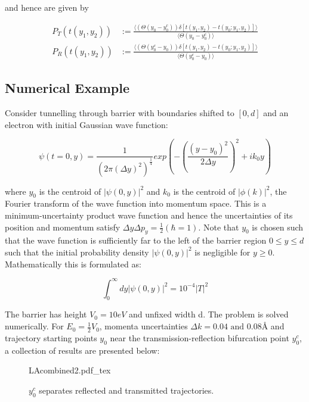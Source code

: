 \documentclass{article}
\newcommand{\incfigsize}[2]{%
    \def\svgwidth{#2cm}
    {#1.pdf_tex}
}
\begin{document}
\noindent and hence are given by

\begin{subequations}
\begin{align}
	P_T(t(y_1,y_2))&:=\frac{\langle(\Theta(y_0-y_0^c))\delta[t(y_1,y_2)-t(y_0;y_1,y_2)]\rangle}{\langle\Theta(y_0-y_0^c)\rangle}\\
	P_R(t(y_1,y_2))&:=\frac{\langle(\Theta(y_0^c-y_0))\delta[t(y_1,y_2)-t(y_0;y_1,y_2)]\rangle}{\langle\Theta(y_0^c-y_0)\rangle}
\end{align}
\end{subequations}

\subsection{Numerical Example}
\label{subsection:dBBexample}
\noindent Consider tunnelling through barrier with boundaries shifted to $[0, d]$ and an electron with initial Gaussian wave function:

\begin{equation}
	\psi(t=0,y) = \frac{1}{(2\pi(\Delta y)^2)^{\frac{1}{4}}}exp\left(-\left(\frac{(y-y_0)^2}{2\Delta y}\right)^2+ik_0y\right)
\end{equation}

\noindent where $y_0$ is the centroid of $|\psi(0,y)|^2$ and $k_0$ is the centroid of $|\phi(k)|^2$, the Fourier transform of the wave function into momentum space. This is a minimum-uncertainty product wave function and hence the uncertainties of its position and momentum satisfy $\Delta y\Delta p_y = \frac{1}{2} (\hbar = 1)$. Note that $y_0$ is chosen such that the wave function is sufficiently far to the left of the barrier region $0\leq y\leq d$ such that the initial probability density $|\psi(0,y)|^2$ is negligible for $y \geq 0$. Mathematically this is formulated as:

\begin{equation}
	\int_0^\infty dy |\psi(0,y)|^2 = 10^{-4}|T|^2
\end{equation}

\noindent The barrier has height $V_0 = 10eV$ and unfixed width d. The problem is solved numerically. For $E_0 = \frac{1}{2}V_0$, momenta uncertainties $\Delta k = 0.04 \text{ and } 0.08 \text{{\AA}}$ and trajectory starting points $y_0$ near the transmission-reflection bifurcation point $y_0^c$, a collection of results are presented below:

\begin{figure}[ht]
    \centering
    \incfigsize{LAcombined2}{15}
    \caption{$y_0^c$ separates reflected and transmitted trajectories.}
    \label{fig:trajectories111wrwd}
\end{figure}
\end{document}
